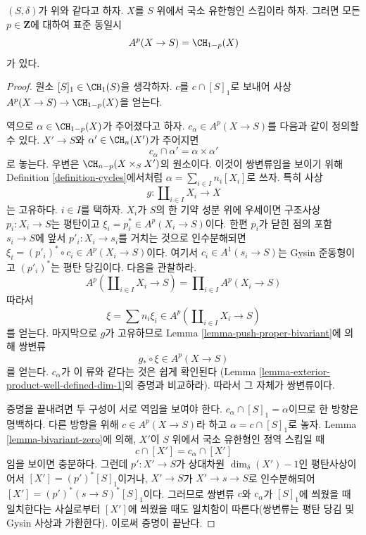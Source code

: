 \begin{lemma}
\label{lemma-chow-cohomology-towards-base-dim-1}
$(S, \delta)$가 위와 같다고 하자. $X$를 $S$ 위에서 국소 유한형인
스킴이라 하자. 그러면 모든 $p \in \mathbf{Z}$에 대하여 표준 동일시
$$
A^p(X \to S) = \CH_{1 - p}(X)
$$
가 있다.
\end{lemma}

\begin{proof}
원소 $[S]_1 \in \CH_1(S)$을 생각하자. $c$를 $c \cap [S]_1$로 보내어
사상 $A^p(X \to S) \to \CH_{1 - p}(X)$을 얻는다.

\medskip\noindent
역으로 $\alpha \in \CH_{1 - p}(X)$가 주어졌다고 하자.
$c_\alpha \in A^p(X \to S)$를 다음과 같이 정의할 수 있다.
$X' \to S$와 $\alpha' \in \CH_n(X')$가 주어지면
$$
c_\alpha \cap \alpha' = \alpha \times \alpha'
$$
로 놓는다. 우변은 $\CH_{n - p}(X \times_S X')$의 원소이다. 이것이
쌍변류임을 보이기 위해 Definition \ref{definition-cycles}에서처럼
$\alpha = \sum_{i \in I} n_i[X_i]$로 쓰자. 특히 사상
$$
g : \coprod\nolimits_{i \in I} X_i \longrightarrow X
$$
는 고유하다. $i \in I$를 택하자. $X_i$가 $S$의 한 기약 성분 위에
우세이면 구조사상 $p_i : X_i \to S$는 평탄이고
$\xi_i = p_i^* \in A^p(X_i \to S)$이다. 한편 $p_i$가 닫힌 점의 포함
$s_i \to S$에 앞서 $p'_i : X_i \to s_i$를 거치는 것으로
인수분해되면
$\xi_i = (p'_i)^* \circ c_i \in A^p(X_i \to S)$이다. 여기서
$c_i \in A^1(s_i \to S)$는 Gysin 준동형이고
$(p'_i)^*$는 평탄 당김이다. 다음을 관찰하라.
$$
A^p(\coprod\nolimits_{i \in I} X_i \to S) =
\prod\nolimits_{i \in I} A^p(X_i \to S)
$$
따라서
$$
\xi = \sum n_i \xi_i \in A^p(\coprod\nolimits_{i \in I} X_i \to S)
$$
를 얻는다. 마지막으로 $g$가 고유하므로 Lemma
\ref{lemma-push-proper-bivariant}에 의해 쌍변류
$$
g_* \circ \xi \in A^p(X \to S)
$$
를 얻는다. $c_\alpha$가 이 류와 같다는 것은 쉽게 확인된다
(Lemma \ref{lemma-exterior-product-well-defined-dim-1}의 증명과
비교하라). 따라서 그 자체가 쌍변류이다.

\medskip\noindent
증명을 끝내려면 두 구성이 서로 역임을 보여야 한다.
$c_\alpha \cap [S]_1 = \alpha$이므로 한 방향은 명백하다.
다른 방향을 위해 $c \in A^p(X \to S)$라 하고
$\alpha = c \cap [S]_1$로 놓자. Lemma \ref{lemma-bivariant-zero}에
의해, $X'$이 $S$ 위에서 국소 유한형인 정역 스킴일 때
$$
c \cap [X'] = c_\alpha \cap [X']
$$
임을 보이면 충분하다. 그런데 $p' : X' \to S$가 상대차원
$\dim_\delta(X') - 1$인 평탄사상이어서
$[X'] = (p')^*[S]_1$이거나, $X' \to S$가
$X' \to s \to S$로 인수분해되어
$[X'] = (p')^*(s \to S)^*[S]_1$이다. 그러므로 쌍변류 $c$와
$c_\alpha$가 $[S]_1$에 씌웠을 때 일치한다는 사실로부터 $[X']$에
씌웠을 때도 일치함이 따른다(쌍변류는 평탄 당김 및 Gysin 사상과
가환한다). 이로써 증명이 끝난다.
\end{proof}

